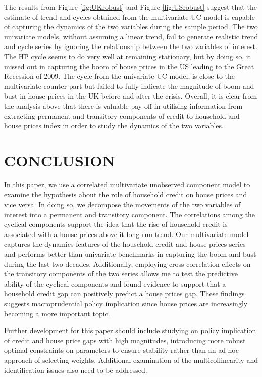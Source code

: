 \documentclass[
  12pt,
]{article}
\begin{document}
The results from Figure \ref{fig:UKrobust} and Figure \ref{fig:USrobust} suggest that the estimate of trend and cycles obtained from the multivariate UC model is capable of capturing the dynamics of the two variables during the sample period. The two univariate models, without assuming a linear trend, fail to generate realistic trend and cycle series by ignoring the relationship between the two variables of interest. The HP cycle seems to do very well at remaining stationary, but by doing so, it missed out in capturing the boom of house prices in the US leading to the Great Recession of 2009. The cycle from the univariate UC model, is close to the multivariate counter part but failed to fully indicate the magnitude of boom and bust in house prices in the UK before and after the crisis. Overall, it is clear from the analysis above that there is valuable pay-off in utilising information from extracting permanent and transitory components of credit to household and house prices index in order to study the dynamics of the two variables.

\hypertarget{conclusion}{%
\section{CONCLUSION}\label{conclusion}}

In this paper, we use a correlated multivariate unobserved component model to examine the hypothesis about the role of household credit on house prices and vice versa. In doing so, we decompose the movements of the two variables of interest into a permanent and transitory component. The correlations among the cyclical components support the idea that the rise of household credit is associated with a house prices above it long-run trend. Our multivariate model captures the dynamics features of the household credit and house prices series and performs better than univariate benchmarks in capturing the boom and bust during the last two decades. Additionally, employing cross correlation effects on the transitory components of the two series allows me to test the predictive ability of the cyclical components and found evidence to support that a household credit gap can positively predict a house prices gap. These findings suggests macroprudential policy implication since house prices are increasingly becoming a more important topic.

Further development for this paper should include studying on policy implication of credit and house price gaps with high magnitudes, introducing more robust optimal constraints on parameters to ensure stability rather than an ad-hoc approach of selecting weights. Additional examination of the multicollinearity and identification issues also need to be addressed.
\end{document}
